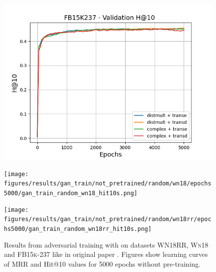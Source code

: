 \begin{figure}
    \begin{minipage}{.3\textwidth}
      \centering
      \includegraphics[width=\linewidth]{figures/results/gan_train/not_pretrained/random/fb15k237/epochs5000/gan_train_random_fb15k237_hit10s.png}
    \end{minipage}%
     \begin{minipage}{.3\textwidth}
      \centering
      \texttt{[image: figures/results/gan\_train/not\_pretrained/random/wn18/epochs5000/gan\_train\_random\_wn18\_hit10s.png]}
    \end{minipage}%
     \begin{minipage}{.3\textwidth}
      \centering
      \texttt{[image: figures/results/gan\_train/not\_pretrained/random/wn18rr/epochs5000/gan\_train\_random\_wn18rr\_hit10s.png]}
    \end{minipage}%
    \caption{Results from adversarial training with \origsampling on datasets \textsc{WN18RR}, \textsc{Wn18} and \textsc{FB15k-237} like in original \kbgan paper \cite{cai2017kbgan}.
    Figures show learning curves of MRR and Hit@10 values for 5000 epochs without pre-training.}
    \label{fig:gan_train_not_pretrained_random}
\end{figure}